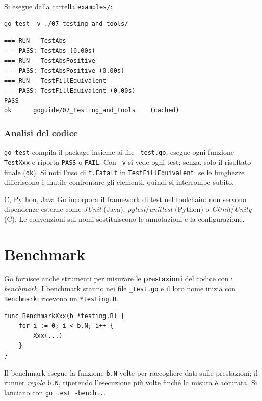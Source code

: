 \documentclass[11pt,a4paper]{report}
\newcommand{\cod}[1]{\texttt{#1}}
\begin{document}
Si esegue dalla cartella \texttt{examples/}:

\begin{lstlisting}[style=shell]
go test -v ./07_testing_and_tools/
\end{lstlisting}

\begin{lstlisting}[style=output]
=== RUN   TestAbs
--- PASS: TestAbs (0.00s)
=== RUN   TestAbsPositive
--- PASS: TestAbsPositive (0.00s)
=== RUN   TestFillEquivalent
--- PASS: TestFillEquivalent (0.00s)
PASS
ok  	goguide/07_testing_and_tools	(cached)
\end{lstlisting}

\subsubsection*{Analisi del codice}

\cod{go test} compila il package insieme ai file \cod{\_test.go}, esegue ogni
funzione \cod{TestXxx} e riporta \cod{PASS} o \cod{FAIL}. Con \cod{-v} si
vede ogni test; senza, solo il risultato finale (\cod{ok}). Si noti l'uso di
\cod{t.Fatalf} in \cod{TestFillEquivalent}: se le lunghezze differiscono è inutile
confrontare gli elementi, quindi si interrompe subito.

\begin{confronto}{C, Python, Java}
Go incorpora il framework di test nel toolchain: non servono dipendenze
esterne come \emph{JUnit} (Java), \emph{pytest}/\emph{unittest} (Python) o
\emph{CUnit}/\emph{Unity} (C). Le convenzioni sui nomi sostituiscono le
annotazioni e la configurazione.
\end{confronto}

\section{Benchmark}

Go fornisce anche strumenti per misurare le \textbf{prestazioni} del codice con i
\emph{benchmark}. I benchmark stanno nei file \texttt{\_test.go} e il loro nome
inizia con \cod{Benchmark}; ricevono un \cod{*testing.B}.

\begin{lstlisting}[style=gocode,numbers=none,caption={Il benchmark della slide}]
func BenchmarkXxx(b *testing.B) {
	for i := 0; i < b.N; i++ {
		Xxx(...)
	}
}
\end{lstlisting}

Il benchmark esegue la funzione \cod{b.N} volte per raccogliere dati sulle
prestazioni; il runner \emph{regola} \cod{b.N}, ripetendo l'esecuzione più volte
finché la misura è accurata. Si lanciano con \cod{go test -bench=.}.
\end{document}
